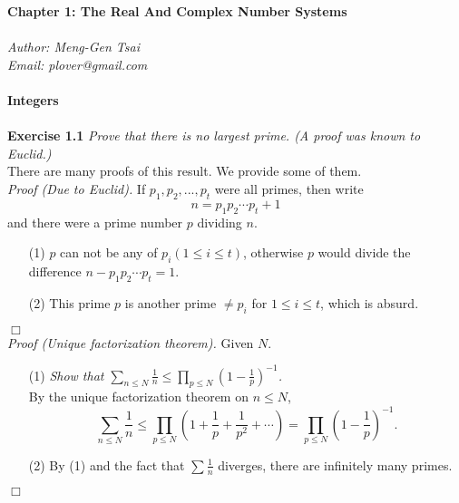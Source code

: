 \documentclass{article}
\begin{document}
\textbf{\Large Chapter 1: The Real And Complex Number Systems} \\\\



\emph{Author: Meng-Gen Tsai} \\
\emph{Email: plover@gmail.com} \\\\



\textbf{\large Integers} \\\\



\textbf{Exercise 1.1}
\emph{Prove that there is no largest prime. (A proof was known to Euclid.)} \\

There are many proofs of this result. We provide some of them. \\

\emph{Proof (Due to Euclid).}
If
$p_1, p_2, ..., p_t$ were all primes, then
write $$n = p_1 p_2 \cdots p_t + 1$$
and there were a prime number $p$ dividing $n$.
\begin{enumerate}
\item[(1)]
$p$ can not be any of $p_i (1 \leq i \leq t)$,
otherwise $p$ would divide the difference $n - p_1 p_2 \cdots p_t = 1$.
\item[(2)]
This prime $p$ is another prime $\neq p_i$ for $1 \leq i \leq t$,
which is absurd.
\end{enumerate}
$\Box$ \\

\emph{Proof (Unique factorization theorem).}
Given $N$.
\begin{enumerate}
\item[(1)]
\emph{Show that $\sum_{n \leq N} \frac{1}{n}
\leq \prod_{p \leq N} \left( 1 - \frac{1}{p} \right)^{-1}$.} \\
By the unique factorization theorem on $n \leq N$,
$$\sum_{n \leq N} \frac{1}{n}
\leq \prod_{p \leq N} \left( 1 + \frac{1}{p} + \frac{1}{p^2} + \cdots \right)
= \prod_{p \leq N} \left( 1 - \frac{1}{p} \right)^{-1}.$$
\item[(2)]
By (1) and the fact that $\sum \frac{1}{n}$ diverges,
there are infinitely many primes.
\end{enumerate}
$\Box$ \\
\end{document}
